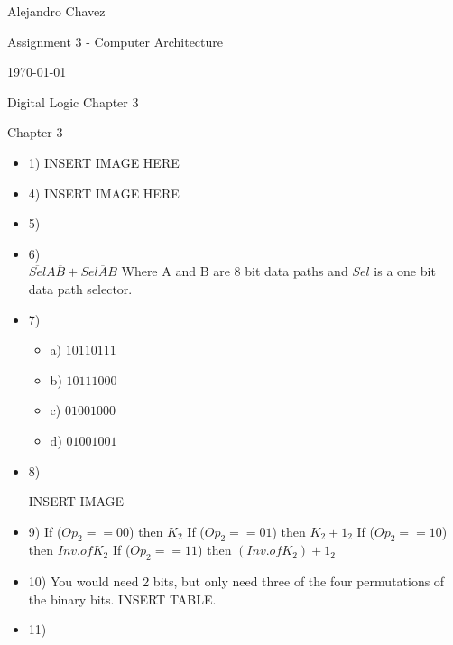 \documentclass{article}
\begin{document}
\hfill Alejandro Chavez

\hfill Assignment 3 - Computer Architecture

\hfill \today\\

\begin{center}\begin{large}Digital Logic Chapter 3\end{large}\end{center}	Chapter 3
\begin{itemize}
	\item
		1)
		INSERT IMAGE HERE
	\item
		4)
		INSERT IMAGE HERE
	\item
		5)\\
		\begin{tabular}
		\end{tabular}
	\item
		6)\\
		$\overline{Sel}A\overline{B}+Sel\overline{A}B$
		Where A and B are 8 bit data paths and $Sel$ is a one bit data path selector.
	\item
		7)\\
	\begin{itemize}
		\item
			a)
			$10110111$
		\item
			b)
			$10111000$
		\item
			c)
			$01001000$
		\item
			d)
			$01001001$
	\end{itemize}
	\item
		8)
		\begin{tabular}
		\end{tabular}
		INSERT IMAGE
	\item
		9)
		If ($Op_{2} == 00$) then $K_{2}$
		If ($Op_{2} == 01$) then $K_{2}+1_{2}$
		If ($Op_{2} == 10$) then $Inv. of K_{2}$
		If ($Op_{2} == 11$) then $(Inv. of K_{2})+1_{2}$
	\item
		10)
		You would need 2 bits, but only need three of the four permutations of the binary bits.
		INSERT TABLE.
		
	\item
		11)
\end{itemize}
\end{document}
